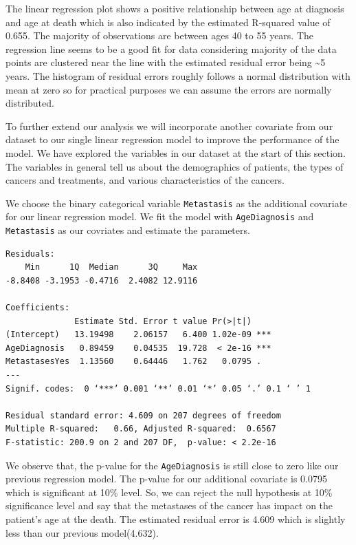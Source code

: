 \documentclass[
]{article}
\begin{document}
The linear regression plot shows a positive relationship between age at
diagnosis and age at death which is also indicated by the estimated
R-squared value of 0.655. The majority of observations are between ages
40 to 55 years. The regression line seems to be a good fit for data
considering majority of the data points are clustered near the line with
the estimated residual error being \textasciitilde5 years. The histogram
of residual errors roughly follows a normal distribution with mean at
zero so for practical purposes we can assume the errors are normally
distributed.

To further extend our analysis we will incorporate another covariate
from our dataset to our single linear regression model to improve the
performance of the model. We have explored the variables in our dataset
at the start of this section. The variables in general tell us about the
demographics of patients, the types of cancers and treatments, and
various characteristics of the cancers.

We choose the binary categorical variable \texttt{Metastasis} as the
additional covariate for our linear regression model. We fit the model
with \texttt{AgeDiagnosis} and \texttt{Metastasis} as our covriates and
estimate the parameters.

\begin{verbatim}
Residuals:
    Min      1Q  Median      3Q     Max 
-8.8408 -3.1953 -0.4716  2.4082 12.9116 

Coefficients:
              Estimate Std. Error t value Pr(>|t|)    
(Intercept)   13.19498    2.06157   6.400 1.02e-09 ***
AgeDiagnosis   0.89459    0.04535  19.728  < 2e-16 ***
MetastasesYes  1.13560    0.64446   1.762   0.0795 .  
---
Signif. codes:  0 ‘***’ 0.001 ‘**’ 0.01 ‘*’ 0.05 ‘.’ 0.1 ‘ ’ 1

Residual standard error: 4.609 on 207 degrees of freedom
Multiple R-squared:   0.66, Adjusted R-squared:  0.6567 
F-statistic: 200.9 on 2 and 207 DF,  p-value: < 2.2e-16
\end{verbatim}

We observe that, the p-value for the \texttt{AgeDiagnosis} is still
close to zero like our previous regression model. The p-value for our
additional covariate is 0.0795 which is significant at 10\% level. So,
we can reject the null hypothesis at 10\% significance level and say
that the metastases of the cancer has impact on the patient's age at the
death. The estimated residual error is 4.609 which is slightly less than
our previous model(4.632).
\end{document}
